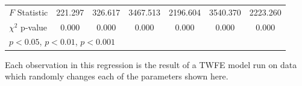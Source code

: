 \documentclass[12pt]{article}
\begin{document}
\begin{table}[htbp]
{\begin{tabular}{p{4.5in}|*{6}{c}}
$F$ Statistic         &     221.297         &     326.617         &    3467.513         &    2196.604         &    3540.370         &    2223.260         \\
$\chi^2$ p-value &       0.000         &       0.000         &       0.000         &       0.000         &       0.000         &       0.000         \\
\hline\hline
\multicolumn{7}{l}{\footnotesize \sym{*} \(p<0.05\), \sym{**} \(p<0.01\), \sym{***} \(p<0.001\)}\\
\end{tabular}
}
\footnotesize  
\vspace{5mm}
    \footnotesize \begin{singlespace*}
        Each observation in this regression is the result of a TWFE model run on data which randomly changes each of the parameters shown here.
    \end{singlespace*}
\end{table}
\end{document}
